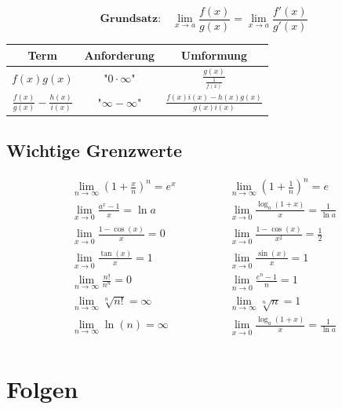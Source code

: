 \begin{equation*}
	\textbf{Grundsatz:}\quad\lim_{x\to a}\frac{f(x)}{g(x)} = \lim_{x\to a}\frac{f'(x)}{g'(x)}
\end{equation*}

\begin{table}[H]
\centering
\begin{tabular}{|c|c|c|}
\hline
\textbf{Term} & \textbf{Anforderung} & \textbf{Umformung} \\ \hline
$f(x)g(x)$              & "$0\cdot\infty$"                     & $\frac{g(x)}{\frac{1}{f(x)}}$          \\ \hline 
$\frac{f(x)}{g(x)} - \frac{h(x)}{i(x)}$ & "$\infty - \infty$"  & $\frac{f(x)i(x) - h(x)g(x)}{g(x)i(x)}$ \\ \hline      
\end{tabular}
\end{table}

\subsection{Wichtige Grenzwerte}

\begin{equation*}
\begin{split}
	\lim\limits_{n \to \infty} \left( 1+\frac{x}{n} \right)^n = e^x \qquad & \qquad \lim\limits_{n \to \infty} \left( 1+\frac{1}{n} \right)^n = e \\
	\lim\limits_{x \to 0} \frac{a^x-1}{x} = \ln a \qquad & \qquad \lim\limits_{x \to 0} \frac{\log_a(1+x)}{x} = \frac{1}{\ln a} \\
	\lim\limits_{x \to 0} \frac{1-\cos(x)}{x} = 0 \quad \qquad & \qquad \lim\limits_{x \to 0} \frac{1-\cos(x)}{x^2} = \frac{1}{2} \\
	\lim\limits_{x \to 0} \frac{\tan(x)}{x} = 1 \qquad & \qquad \lim\limits_{x \to 0} \frac{\sin(x)}{x} = 1 \\
	\lim\limits_{n \to \infty} \frac{n!}{n^n} = 0 \qquad & \qquad \lim\limits_{n \to 0} \frac{e^n -1 }{n} = 1 \\
	\lim\limits_{n \to \infty} \sqrt[n]{n!} = \infty \qquad & \qquad \lim\limits_{n \to \infty} \sqrt[n]{n} = 1 \\
	\lim\limits_{n \to \infty} \ln(n) = \infty \qquad & \qquad \lim\limits_{x \to 0} \frac{\log_a(1+x)}{x} = \frac{1}{\ln a} \\
\end{split}
\end{equation*}

\section{Folgen}

